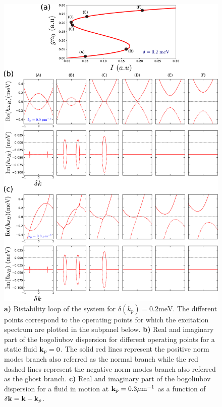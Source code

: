 \begin{figure}[h]
    \centering
    \includegraphics[width=1\textwidth]{chap_AG_theory/fig/bist_et_bogo.pdf}
    \caption{\textbf{a)} Bistability loop of the system for $\delta(k_p)=0.2 \mathrm{meV}$. The different points correspond to the operating points for which the excitation spectrum are plotted in the subpanel below. \textbf{b)} Real and imaginary part of the bogoliubov dispersion for different operating points for a static fluid $\mathbf{k}_p=0$. The solid 
    red lines represent the positive norm modes branch also referred as the normal branch while the red dashed lines represent the negative norm modes branch also referred as the ghost branch. \textbf{c)} Real and imaginary part of the bogoliubov dispersion for a fluid in motion at $\mathbf{k}_p=0.3 \mathrm{\mu m^{-1}}$ as a function of $\delta \mathbf{k} = \mathbf{k}-\mathbf{k}_p$.}
    \label{fig:bist_et_bogo}
\end{figure}


